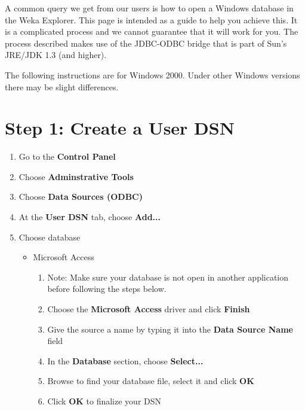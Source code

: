 
A common query we get from our users is how to open a Windows database in the Weka Explorer. This page is intended as a guide to help you achieve this. It is a complicated process and we cannot guarantee that it will work for you. The process described makes use of the JDBC-ODBC bridge that is part of Sun's JRE/JDK 1.3 (and higher).

The following instructions are for Windows 2000. Under other Windows versions there may be slight differences.

\section*{Step 1: Create a User DSN}
\begin{enumerate}
	\item Go to the \textbf{Control Panel}
	\item Choose \textbf{Adminstrative Tools}
	\item Choose \textbf{Data Sources (ODBC)}
	\item At the \textbf{User DSN} tab, choose \textbf{Add...}
	\item Choose database
	\begin{itemize}
		\item Microsoft Access
		\begin{enumerate}
			\item Note: Make sure your database is not open in another application before following the steps below.
			\item Choose the \textbf{Microsoft Access} driver and click \textbf{Finish}
			\item Give the source a name by typing it into the \textbf{Data Source Name} field
			\item In the \textbf{Database} section, choose \textbf{Select...}
			\item Browse to find your database file, select it and click \textbf{OK}
			\item Click \textbf{OK} to finalize your DSN
		\end{enumerate}


\end{itemize}
\end{enumerate}
